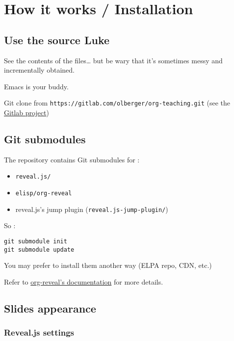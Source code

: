 \documentclass[a4paper]{article}
\newenvironment{NOTES}{\begin{lrbox}{\mybox}\begin{minipage}{0.9\textwidth}\begin{shaded}}{\end{shaded}\end{minipage}\end{lrbox}\fbox{\usebox{\mybox}}}
\begin{document}
\section{How it works / Installation}
\label{sec:orgfb70633}
\subsection{Use the source Luke}
\label{sec:orged0869f}

See the contents of the files\ldots{} but be wary that it's sometimes messy and incrementally obtained.

Emacs is your buddy.

Git clone from \texttt{https://gitlab.com/olberger/org-teaching.git} (see the \href{https://gitlab.com/olberger/org-teaching}{Gitlab project})

\subsection{Git submodules}
\label{sec:org3490b6d}

The repository contains Git submodules for :
\begin{itemize}
\item \texttt{reveal.js/}
\item \texttt{elisp/org-reveal}
\item reveal.js's jump plugin (\texttt{reveal.js-jump-plugin/})
\end{itemize}

So :
\begin{verbatim}
git submodule init
git submodule update
\end{verbatim}
You may prefer to install them another way (ELPA repo, CDN, etc.)

\begin{NOTES}
Refer to \href{https://github.com/yjwen/org-reveal/\#requirements-and-installation}{org-reveal's documentation} for more details.
\end{NOTES}

\subsection{Slides appearance}
\label{sec:org4266747}

\subsubsection{Reveal.js settings}
\label{sec:orgc8c5e3b}
\end{document}
